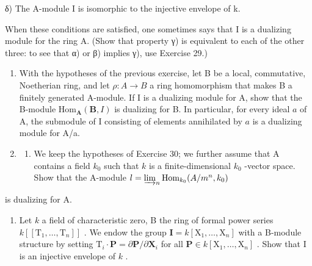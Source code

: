 δ) The A-module I is isomorphic to the injective envelope of k.

When these conditions are satisfied, one sometimes says that I is a dualizing module for the ring A. (Show that property γ) is equivalent to each of the other three: to see that α) or β) implies γ), use Exercise 29.)

\begin{enumerate}
\def\labelenumi{\arabic{enumi})}
\setcounter{enumi}{30}
\item
  With the hypotheses of the previous exercise, let B be a local, commutative, Noetherian ring, and let \(\rho: A \to B\) a ring homomorphism that makes B a finitely generated A-module. If I is a dualizing module for A, show that the B-module \(\mathrm{Hom}_{\mathbf{A}}(\mathbf{B}, I)\) is dualizing for B. In particular, for every ideal \(a\) of A, the submodule of I consisting of elements annihilated by \(a\) is a dualizing module for A/a.
\item
  \begin{enumerate}
  \def\labelenumii{\alph{enumii})}
  \tightlist
  \item
    We keep the hypotheses of Exercise 30; we further assume that A contains a field \(k_0\) such that \(k\) is a finite-dimensional \(k_0\) -vector space. Show that the A-module \(l = \varinjlim_{n} \operatorname{Hom}_{k_0}(A/m^n, k_0)\)
  \end{enumerate}
\end{enumerate}

is dualizing for A.

\begin{enumerate}
\def\labelenumi{\alph{enumi})}
\setcounter{enumi}{1}
\tightlist
\item
  Let \(k\) a field of characteristic zero, B the ring of formal power series \(k[[\mathrm{T}_{1}, \ldots, \mathrm{T}_{n}]]\) . We endow the group \(\mathbf{I} = k[\mathrm{X}_{1}, \ldots, \mathrm{X}_{n}]\) with a B-module structure by setting \(\mathrm{T}_{i} \cdot \mathbf{P} = \partial \mathbf{P} / \partial \mathbf{X}_{i}\) for all \(\mathbf{P} \in k[\mathrm{X}_{1}, \ldots, \mathrm{X}_{n}]\) . Show that I is an injective envelope of \(k\) .
\end{enumerate}

